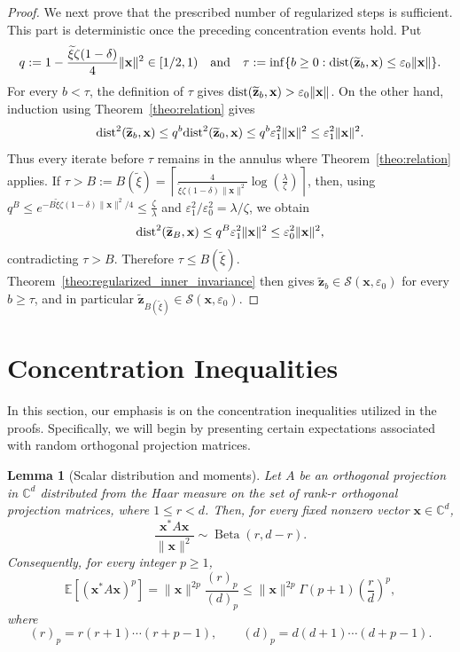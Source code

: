 \documentclass{article}
\newcommand{\C}{{\mathbb C}}
\newcommand{\E}{{\mathbb E}}
\newcommand{\calS}{{\mathcal S}}
\newcommand{\dist}{{\rm dist}}
\newcommand{\vx}{{\mathbf x}}
\newcommand{\vz}{{\mathbf z}}
\newcommand{\0}{{\mathbf 0}}
\newtheorem{lemma}[theorem]{Lemma}
\numberwithin{equation}{section}
\begin{document}
\begin{proof}
		We next prove that the prescribed number of regularized steps is sufficient.  This part is deterministic once the preceding concentration events hold.  Put
		\[
		q:=1-\frac{\widetilde\xi\zeta(1-\delta)}4\|\vx\|^2\in[1/2,1)
		\quad\text{and}\quad
		\tau:=\inf\{b\ge0:\dist(\widetilde\vz_b,\vx)\le\varepsilon_0\|\vx\|\}.
		\] 
		For every $b<\tau$, the definition of $\tau$ gives
		$\dist(\widetilde\vz_b,\vx)>\varepsilon_0\|\vx\|$.  On the other hand, induction using Theorem~\ref{theo:relation} gives
		\[
		\dist^2(\widetilde\vz_b,\vx)
		\le q^b\dist^2(\widetilde\vz_0,\vx)
		\le q^b\varepsilon_1^2\|\vx\|^2
		\le\varepsilon_1^2\|\vx\|^2.
		\]
		Thus every iterate before $\tau$ remains in the annulus where Theorem~\ref{theo:relation} applies.
		If $\tau>B:=B(\widetilde\xi)=\left\lceil\frac{4}{\widetilde\xi\zeta(1-\delta)\|\vx\|^2}\log\!\left(\frac{\lambda}{\zeta}\right)\right\rceil$, then, using $q^B\le e^{-B\widetilde\xi\zeta(1-\delta)\|\vx\|^2/4}\le\frac{\zeta}{\lambda}$ and $\varepsilon_1^2/\varepsilon_0^2=\lambda/\zeta$, we obtain
		\[
		\dist^2(\widetilde\vz_B,\vx)\le q^B\varepsilon_1^2\|\vx\|^2\le\varepsilon_0^2\|\vx\|^2,
		\]
		contradicting $\tau>B$. Therefore $\tau\le B(\widetilde\xi)$. Theorem~\ref{theo:regularized_inner_invariance} then gives $\widetilde\vz_b\in\calS(\vx,\varepsilon_0)$ for every $b\ge\tau$, and in particular $\widetilde\vz_{B(\widetilde\xi)}\in\calS(\vx,\varepsilon_0)$.
	\end{proof}
	\section{Concentration Inequalities}
	\label{sec:concentration}
	In this section, our emphasis is on the concentration inequalities utilized in the proofs. Specifically, we will begin by presenting certain expectations associated with random orthogonal projection matrices.
	\begin{lemma}[Scalar distribution and moments]
		\label{lem:beta-d}
		Let $A$ be an orthogonal projection in $\C^d$ distributed from the Haar measure on the set of rank-$r$ orthogonal projection matrices, where $1\le r<d$. Then, for every fixed nonzero vector $\vx\in\C^d$,
		\[
		\frac{\vx^*A\vx}{\|\vx\|^2}\sim\operatorname{Beta}(r,d-r).
		\]
		Consequently, for every integer $p\ge 1$,
		\[
		\E\left[(\vx^*A\vx)^p\right]=\|\vx\|^{2p}\frac{(r)_p}{(d)_p}\leq\|\vx\|^{2p}\Gamma(p+1)\left(\frac{r}{d}\right)^p,
		\]
		where
		\[
		(r)_p=r(r+1)\cdots(r+p-1),\qquad (d)_p=d(d+1)\cdots(d+p-1).
		\]
	\end{lemma}
	
\end{document}
